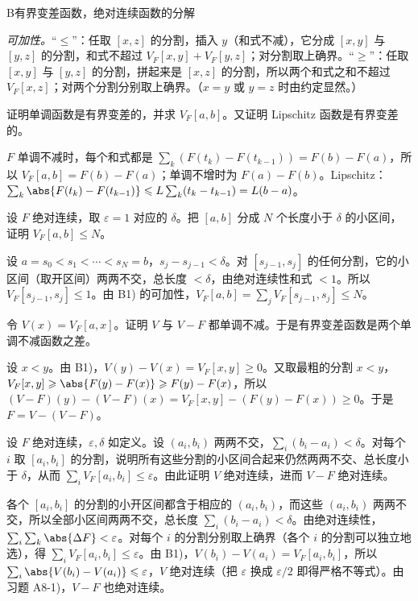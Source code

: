 \begin{probleme}{B}{有界变差函数，绝对连续函数的分解}
\begin{questions}
\begin{solution}
\emph{可加性。}“$\leqslant$”：任取 $[x,z]$ 的分割，插入 $y$（和式不减），它分成 $[x,y]$ 与 $[y,z]$ 的分割，和式不超过 $V_F[x,y]+V_F[y,z]$；对分割取上确界。“$\geqslant$”：任取 $[x,y]$ 与 $[y,z]$ 的分割，拼起来是 $[x,z]$ 的分割，所以两个和式之和不超过 $V_F[x,z]$；对两个分割分别取上确界。（$x=y$ 或 $y=z$ 时由约定显然。）
\end{solution}
\item 证明单调函数是有界变差的，并求 $V_F[a,b]$。又证明 Lipschitz 函数是有界变差的。
\begin{solution}
$F$ 单调不减时，每个和式都是 $\sum_k(F(t_k)-F(t_{k-1}))=F(b)-F(a)$，所以 $V_F[a,b]=F(b)-F(a)$；单调不增时为 $F(a)-F(b)$。Lipschitz：$\sum_k\abs{F(t_k)-F(t_{k-1})}\leqslant L\sum_k(t_k-t_{k-1})=L(b-a)$。
\end{solution}
\item 设 $F$ 绝对连续，取 $\varepsilon=1$ 对应的 $\delta$。把 $[a,b]$ 分成 $N$ 个长度小于 $\delta$ 的小区间，证明 $V_F[a,b]\leqslant N$。
\begin{solution}
设 $a=s_0<s_1<\cdots<s_N=b$，$s_j-s_{j-1}<\delta$。对 $[s_{j-1},s_j]$ 的任何分割，它的小区间（取开区间）两两不交，总长度 $<\delta$，由绝对连续性和式 $<1$。所以 $V_F[s_{j-1},s_j]\leqslant1$。由 B1) 的可加性，$V_F[a,b]=\sum_jV_F[s_{j-1},s_j]\leqslant N$。
\end{solution}
\item 令 $V(x)=V_F[a,x]$。证明 $V$ 与 $V-F$ 都单调不减。于是有界变差函数是两个单调不减函数之差。
\begin{solution}
设 $x<y$。由 B1)，$V(y)-V(x)=V_F[x,y]\geqslant0$。又取最粗的分割 $x<y$，$V_F[x,y]\geqslant\abs{F(y)-F(x)}\geqslant F(y)-F(x)$，所以 $(V-F)(y)-(V-F)(x)=V_F[x,y]-(F(y)-F(x))\geqslant0$。于是 $F=V-(V-F)$。
\end{solution}
\item 设 $F$ 绝对连续，$\varepsilon,\delta$ 如定义。设 $(a_i,b_i)$ 两两不交，$\sum_i(b_i-a_i)<\delta$。对每个 $i$ 取 $[a_i,b_i]$ 的分割，说明所有这些分割的小区间合起来仍然两两不交、总长度小于 $\delta$，从而 $\sum_iV_F[a_i,b_i]\leqslant\varepsilon$。由此证明 $V$ 绝对连续，进而 $V-F$ 绝对连续。
\begin{solution}
各个 $[a_i,b_i]$ 的分割的小开区间都含于相应的 $(a_i,b_i)$，而这些 $(a_i,b_i)$ 两两不交，所以全部小区间两两不交，总长度 $\sum_i(b_i-a_i)<\delta$。由绝对连续性，$\sum_i\sum_k\abs{\Delta F}<\varepsilon$。对每个 $i$ 的分割分别取上确界（各个 $i$ 的分割可以独立地选），得 $\sum_iV_F[a_i,b_i]\leqslant\varepsilon$。由 B1)，$V(b_i)-V(a_i)=V_F[a_i,b_i]$，所以 $\sum_i\abs{V(b_i)-V(a_i)}\leqslant\varepsilon$，$V$ 绝对连续（把 $\varepsilon$ 换成 $\varepsilon/2$ 即得严格不等式）。由习题 A8-1)，$V-F$ 也绝对连续。

\end{solution}
\end{questions}
\end{probleme}
